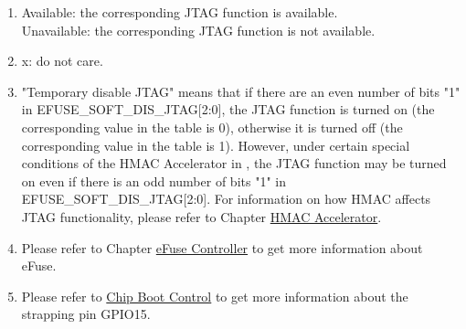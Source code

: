 \begin{tiplisting}
\vspace{-2em}
\begin{enumerate}
\item \label{JTAG footnote: 1}
    Available: the corresponding JTAG function is available. \\
    Unavailable: the corresponding JTAG function is not available.
\item \label{JTAG footnote: 2}
    x: do not care.
\item \label{JTAG footnote: 3}
    "Temporary disable JTAG"  means that if there are an even number of bits "1" in EFUSE\_SOFT\_DIS\_JTAG[2:0], the JTAG function is turned on (the corresponding value in the table is 0), otherwise it is turned off (the corresponding value in the table is 1). However, under certain special conditions of the HMAC Accelerator in \chipname{}, the JTAG function may be turned on even if there is an odd number of bits "1" in EFUSE\_SOFT\_DIS\_JTAG[2:0].
    For information on how HMAC affects JTAG functionality, please refer to Chapter \hyperref[mod:hmac]{HMAC Accelerator}.
\item \label{JTAG footnote: 4}
    Please refer to Chapter \hyperref[mod:efuse]{eFuse Controller} to get more information about eFuse.
\item \label{JTAG footnote: 5}
    Please refer to \hyperref[mod:bootctrl]{Chip Boot Control} to get more information about the strapping pin GPIO15.
\end{enumerate}
\end{tiplisting}
